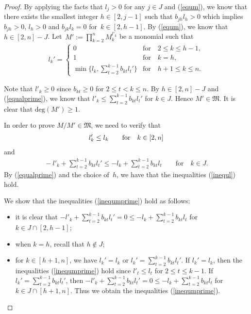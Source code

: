 \documentclass[10pt,a4paper]{amsart}
\numberwithin{equation}{section}
\begin{document}
\begin{proof}
By applying the facts that $l_j>0$ for any $j\in J$ and (\ref{equm}), we know that there exists the smallest integer $h\in[2,j-1]$ such that $b_{jh}l_h>0$ which implies $b_{jh}>0$, $l_h>0$ and $b_{jk}l_k=0$ for~$k\in[2,h-1]$. By (\ref{equm}), we know that $h\in[2,n]-J$.
Let~$M':=\prod\limits_{k=2}^{n}M_{k}^{l'_k}$ be a monomial such that
\begin{gather}\label{equalprime}
l_{k}'=
\begin{cases}
0 &\text{for}\quad 2\leq k\leq h-1,
\\%
1 &\text{for}\quad k=h,
\\
\min\bigg\{l_k,\sum\limits_{t=2}^{k-1}b_{kt}l_{t}'\bigg\}&\text{for}\quad h+1\leq k\leq n.
\end{cases}
\end{gather}



Note that $l'_k\geq0$ since $b_{kt}\geq0$ for $2\leq t< k\leq n$. By $h\in[2,n]-J$ and (\ref{equalprime}), we know that $l'_k\leq \sum\limits_{t=2}^{k-1}b_{kt}l_{t}'$ for $k\in J$. Hence $M'\in\mathfrak{M}$. It is clear that $\text{deg}(M')\geq1$.

In order to prove $M/M'\in\mathfrak{M}$, we need to verify that
\begin{gather}{\label{inequl}}
l'_k\leq l_k\qquad\text{for}\quad k\in[2,n]
\end{gather}
and
\begin{gather}\label{inequmprime}
{}-l'_k +\sum\limits_{t=2}^{k-1}b_{kt}l_{t}' \leq -l_k +\sum\limits_{t=2}^{k-1}b_{kt}l_{t}
\qquad\text{for}\quad k\in J.
\end{gather}
By (\ref{equalprime}) and the choice of~$h$, we have that the inequalities (\ref{inequl}) hold.

We show that the inequalities (\ref{inequmprime}) hold as follows:
\begin{itemize}\itemsep=0pt
 \item[(a)] it is clear that $-l'_k +\sum\limits_{t=2}^{k-1}b_{kt}l_{t}'=0\leq -l_k +\sum\limits_{t=2}^{k-1}b_{kt}l_{t}$ for $k\in J\cap [2,h-1]$;
 \item[(b)] when $k=h$, recall that $h\notin J$;
 \item[(c)] for $k\in[h+1,n]$, we have $l_{k}'=l_k$ or $l_{k}'=\sum\limits_{t=2}^{k-1}b_{kt}l_{t}'$. If $l_{k}'=l_k$, then the inequalities (\ref{inequmprime}) hold since $l'_t\leq l_{t}$ for $2\leq t\leq k-1$. If $l_{k}'=\sum\limits_{t=2}^{k-1}b_{kt}l_{t}'$, then $-l'_k +\sum\limits_{t=2}^{k-1}b_{kt}l_{t}' =0 \leq -l_k +\sum\limits_{t=2}^{k-1}b_{kt}l_{t}$ for $k\in J\cap[h+1,n]$. Thus we obtain the inequalities (\ref{inequmprime}).
\end{itemize}


\end{proof}
\end{document}
